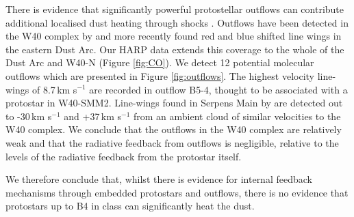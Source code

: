 
There is evidence that significantly powerful protostellar outflows can contribute additional 
localised dust heating through shocks \citep{Buckle:2015vn}. Outflows have been detected 
in the W40 complex by \cite{Zeilik:1978qf} and more recently \cite{van-der-Wiel:2014vn} 
found red and blue shifted line wings in the eastern Dust Arc. Our HARP data extends this 
coverage to the whole of the Dust Arc and W40-N (Figure \ref{fig:CO}). We detect 12 potential 
molecular outflows which are presented in Figure \ref{fig:outflows}. The highest velocity 
line-wings of 8.7\,km s$^{-1}$ are recorded in outflow B5-4, thought to be associated with a 
protostar in W40-SMM2. Line-wings found in Serpens Main by \cite{Graves:2010mb} are 
detected out to -30\,km s$^{-1}$ and +37\,km s$^{-1}$ from an ambient cloud of similar 
velocities to the W40 complex. We conclude that the outflows in the W40 complex are 
relatively weak and that the radiative feedback from outflows is negligible, relative to the 
levels of the radiative feedback from the protostar itself. 

We therefore conclude that, whilst there is evidence for internal feedback mechanisms through 
embedded protostars and outflows, there is no evidence that protostars up to B4 in class can 
significantly heat the dust. 

